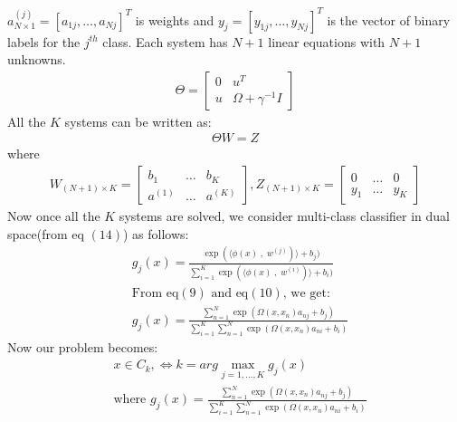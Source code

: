 \documentclass[conference]{IEEEtran}
\begin{document}
    $a^{(j)}_{N \times 1} = [a_{1j}, \ldots, a_{Nj}]^{T}$ is weights and $y_{j} = [y_{1j}, \ldots, y_{Nj}]^{T}$ is the
    vector of binary labels for the $j^{th}$ class.
    Each system has $N+1$ linear equations with $N+1$ unknowns.
    \begin{align}
        \Theta = \begin{bmatrix}
                     0 & u^{T}                 \\
                     u & \Omega + \gamma^{-1}I
        \end{bmatrix}
    \end{align}
    All the $K$ systems can be written as:
    \begin{align}
        \Theta W = Z
    \end{align}
    where
    \begin{align*}
        W_{(N+1) \times K} = \begin{bmatrix}
                                 b_{1}   & \ldots & b_{K}   \\
                                 a^{(1)} & \ldots & a^{(K)}
        \end{bmatrix}
        , Z_{(N+1) \times K} = \begin{bmatrix}
                                   0     & \ldots & 0     \\
                                   y_{1} & \ldots & y_{K}
        \end{bmatrix}
    \end{align*}
    Now once all the $K$ systems are solved, we consider multi-class classifier in dual space(from eq $(14)$) as follows:
    \begin{align*}
        &g_{j}(x) = \frac{\exp(\langle \phi(x)\;,\; w^{(j)})\rangle + b_{j})}{\sum_{i=1}^{K} \exp(\langle \phi(x)\;,\; w^{(i)})\rangle + b_{i})}\\
        &\text{From eq$(9)$ and eq$(10)$, we get:} \\
        &g_{j}(x) = \frac{\sum_{n=1}^{N}\exp(\Omega(x,x_{n})a_{nj} + b_{j})}{\sum_{i=1}^{K} \sum_{n=1}^{N}\exp(\Omega(x,x_{n})a_{ni} + b_{i})}
    \end{align*}
    Now our problem becomes:
    \begin{align*}
        & x \in C_{k}, \Leftrightarrow k= arg \max_{j=1,\ldots,K} g_{j}(x)\\
        & \text{where } g_{j}(x) = \frac{\sum_{n=1}^{N}\exp(\Omega(x,x_{n})a_{nj} + b_{j})}{\sum_{i=1}^{K} \sum_{n=1}^{N}\exp(\Omega(x,x_{n})a_{ni} + b_{i})}
    \end{align*}
\end{document}
